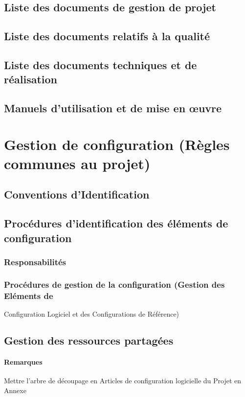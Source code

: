 \documentclass[a4paper]{article}
\begin{document}
\subsection{Liste des documents de gestion de projet}
\subsection{Liste des documents relatifs à la qualité}
\subsection{Liste des documents techniques et de réalisation}
\subsection{Manuels d'utilisation et de mise en œuvre}

\section{Gestion de configuration (Règles communes au projet)}
\subsection{Conventions d'Identification}
\subsection{Procédures d'identification des éléments de configuration }
\subsubsection{Responsabilités}
\subsubsection{Procédures de gestion de la configuration (Gestion des Eléments de }
Configuration Logiciel et des Configurations de Référence)
\subsection{Gestion des ressources partagées}

\paragraph{Remarques} Mettre l'arbre de découpage en Articles de configuration logicielle du Projet en Annexe
\end{document}
